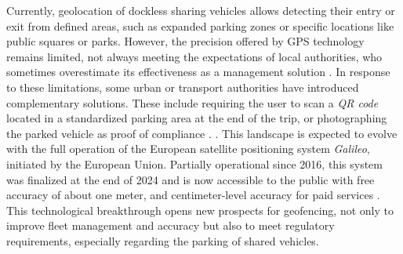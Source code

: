 \begin{refsegment}
{    Currently, geolocation of dockless sharing vehicles allows detecting their entry or exit from defined areas, such as expanded parking zones or specific locations like public squares or parks. However, the precision offered by \acrshort{GPS} technology remains limited, not always meeting the expectations of local authorities, who sometimes overestimate its effectiveness as a management solution \textcolor{blue}{\autocite[123]{6t-bureau_de_recherche_livre_2019}}. In response to these limitations, some urban or transport authorities have introduced complementary solutions. These include requiring the user to scan a \textsl{QR code} located in a standardized parking area at the end of the trip, or photographing the parked vehicle as proof of compliance \textcolor{blue}{\autocite[96]{6t-bureau_de_recherche_livre_2019}}.
}. This landscape is expected to evolve with the full operation of the European satellite positioning system \textsl{Galileo}, initiated by the European Union. Partially operational since 2016, this system was finalized at the end of 2024 and is now accessible to the public with free accuracy of about one meter, and centimeter-level accuracy for paid services \textcolor{blue}{\autocite{futura_sciences_galileo_2019}}. This technological breakthrough opens new prospects for geofencing, not only to improve fleet management and accuracy but also to meet regulatory requirements, especially regarding the parking of shared vehicles.%


\end{refsegment}
